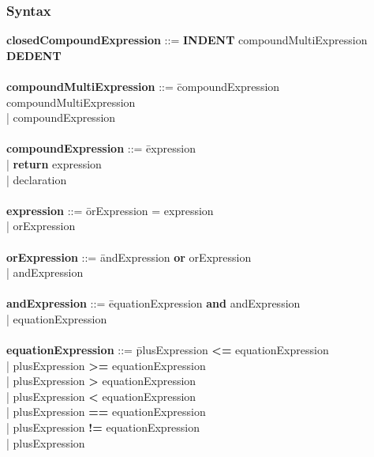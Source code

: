     \subsubsection{Syntax}
        \begin{tabbing} 
            {\bf closedCompoundExpression}    ::= \textbf{INDENT} compoundMultiExpression \textbf{DEDENT}\\
            \\ 
            {\bf compoundMultiExpression}     ::= \=compoundExpression compoundMultiExpression\\
                                                  \>| compoundExpression\\
            \\
            {\bf compoundExpression}          ::= \=expression\\
                                                  \>| \textbf{return} expression\\
                                                  \>| declaration\\
            \\ 
            {\bf expression}                  ::= \=orExpression = expression\\
                                                  \>| orExpression\\
            \\   
            {\bf orExpression}                ::= \=andExpression \textbf{or} orExpression\\
                                                  \>| andExpression\\
            \\   
            {\bf andExpression}               ::= \=equationExpression \textbf{and} andExpression\\
                                                  \>| equationExpression\\
            \\ 
            {\bf equationExpression}          ::= \=plusExpression \textbf{\textless{}=} equationExpression\\
                                                  \>| plusExpression \textbf{\textgreater{}=} equationExpression\\
                                                  \>| plusExpression \textbf{\textgreater{}} equationExpression\\
                                                  \>| plusExpression \textbf{\textless{}} equationExpression\\
                                                  \>| plusExpression \textbf{==} equationExpression\\
                                                  \>| plusExpression \textbf{!=} equationExpression\\
                                                  \>| plusExpression\\


\end{tabbing}
